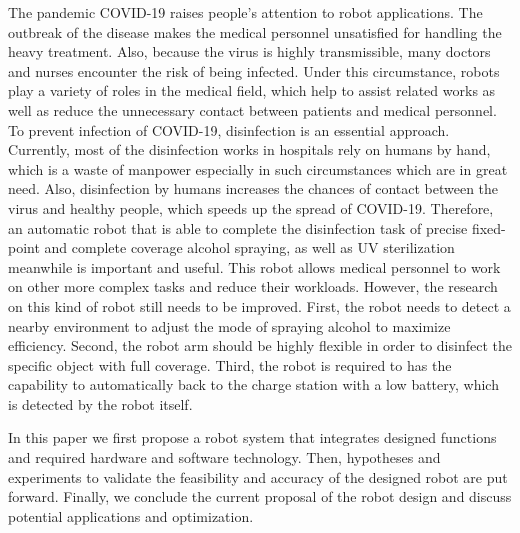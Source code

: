 The pandemic COVID-19 raises people's attention to robot applications. The outbreak of the disease makes the medical personnel unsatisfied for handling the heavy treatment. Also, because the virus is highly transmissible, many doctors and nurses encounter the risk of being infected. Under this circumstance, robots play a variety of roles in the medical field, which help to assist related works as well as reduce the unnecessary contact between patients and medical personnel. To prevent infection of COVID-19, disinfection is an essential approach. Currently, most of the disinfection works in hospitals rely on humans by hand, which is a waste of manpower especially in such circumstances which are in great need. Also, disinfection by humans increases the chances of contact between the virus and healthy people, which speeds up the spread of COVID-19. Therefore, an automatic robot that is able to complete the disinfection task of precise fixed-point and complete coverage alcohol spraying, as well as UV sterilization meanwhile is important and useful. This robot allows medical personnel to work on other more complex tasks and reduce their workloads. However, the research on this kind of robot still needs to be improved. First, the robot needs to detect a nearby environment to adjust the mode of spraying alcohol to maximize efficiency. Second, the robot arm should be highly flexible in order to disinfect the specific object with full coverage. Third, the robot is required to has the capability to automatically back to the charge station with a low battery, which is detected by the robot itself.
\par In this paper we first propose a robot system that integrates designed functions and required hardware and software technology. Then, hypotheses and experiments to validate the feasibility and accuracy of the designed robot are put forward. Finally, we conclude the current proposal of the robot design and discuss potential applications and optimization.

